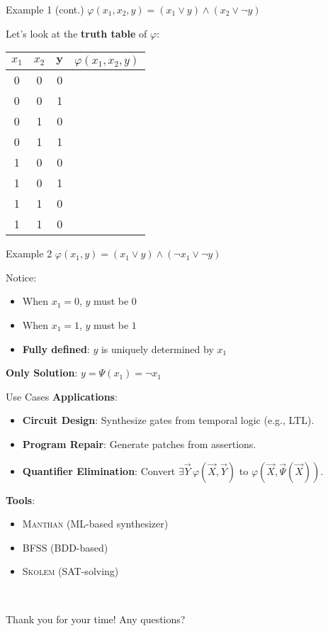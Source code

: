 \documentclass[aspectratio=169]{beamer}
\begin{document}
\begin{frame}{Example 1 (cont.)}
$\varphi(x_1, x_2, y) = (x_1 \lor y) \land (x_2 \lor \neg y)$
\bigskip

Let's look at the \textbf{truth table} of \(\varphi\):
\begin{center}
    \begin{tabular}{|c|c|c|c|}
        \hline
        $x_1$ & $x_2$ & $\mathbf{y}$ & $\varphi(x_1, x_2, y)$ \\
        \hline
        0 & 0 & 0 & \\
        0 & 0 & 1 & \\
        0 & 1 & 0 & \\
        0 & 1 & 1 & \\
        1 & 0 & 0 & \\
        1 & 0 & 1 & \\
        1 & 1 & 0 & \\
        1 & 1 & 0 & \\
        \hline
    \end{tabular}
\end{center}
\end{frame}

\begin{frame}{Example 2}
$\varphi(x_1, y) = (x_1 \lor y) \land (\neg x_1 \lor \neg y)$
\bigskip

Notice:
\begin{itemize}
    \item When $x_1 = 0$, $y$ must be $0$
    \item When $x_1 = 1$, $y$ must be $1$
    \item \textbf{Fully defined}: $y$ is uniquely determined by $x_1$
\end{itemize}
\bigskip

\textbf{Only Solution}: $y = \Psi(x_1) = \neg x_1$
\bigskip

\end{frame}

\begin{frame}{Use Cases}
  \textbf{Applications}:
  \begin{itemize}
    \item \textbf{Circuit Design}: Synthesize gates from temporal logic (e.g., \textsc{LTL}).
    \item \textbf{Program Repair}: Generate patches from assertions.
    \item \textbf{Quantifier Elimination}: Convert \(\exists \vec{Y}\, \varphi(\vec{X}, \vec{Y})\) to \(\varphi(\vec{X}, \vec{\Psi}(\vec{X}))\).
  \end{itemize}

  \vspace{0.3cm}
  \textbf{Tools}:
  \begin{itemize}
    \item \textsc{Manthan} (ML-based synthesizer)
    \item \textsc{BFSS} (BDD-based)
    \item \textsc{Skolem} (SAT-solving)
  \end{itemize}
\end{frame}
\

\begin{frame}{Thank you for your time!}
    Any questions?
\end{frame}
\end{document}

